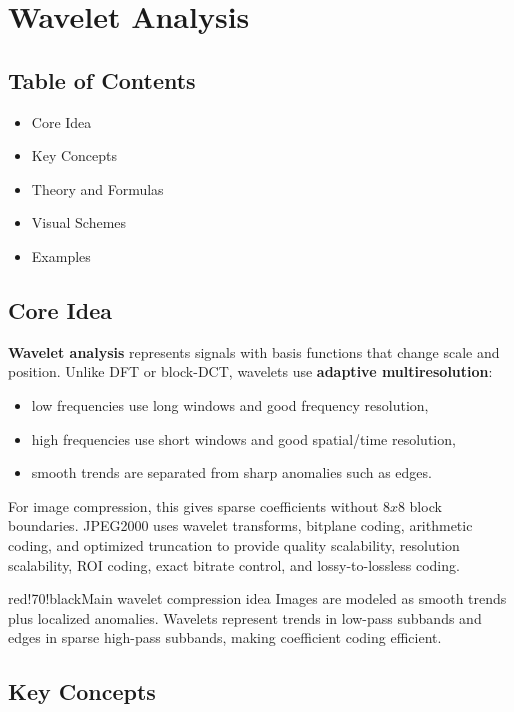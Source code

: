 \chapter{Wavelet Analysis}

\section{Table of Contents}

\begin{itemize}
  \item Core Idea
  \item Key Concepts
  \item Theory and Formulas
  \item Visual Schemes
  \item Examples
\end{itemize}

\section{Core Idea}

\textbf{Wavelet analysis} represents signals with basis functions that change scale and position. Unlike DFT or block-DCT, wavelets use \textbf{adaptive multiresolution}:

\begin{itemize}
  \item low frequencies use long windows and good frequency resolution,
  \item high frequencies use short windows and good spatial/time resolution,
  \item smooth trends are separated from sharp anomalies such as edges.
\end{itemize}

For image compression, this gives sparse coefficients without $8x8$ block boundaries. JPEG2000 uses wavelet transforms, bitplane coding, arithmetic coding, and optimized truncation to provide quality scalability, resolution scalability, ROI coding, exact bitrate control, and lossy-to-lossless coding.

\begin{calloutbox}{red!70!black}{Main wavelet compression idea}
Images are modeled as smooth trends plus localized anomalies. Wavelets represent trends in low-pass subbands and edges in sparse high-pass subbands, making coefficient coding efficient.
\end{calloutbox}

\section{Key Concepts}

